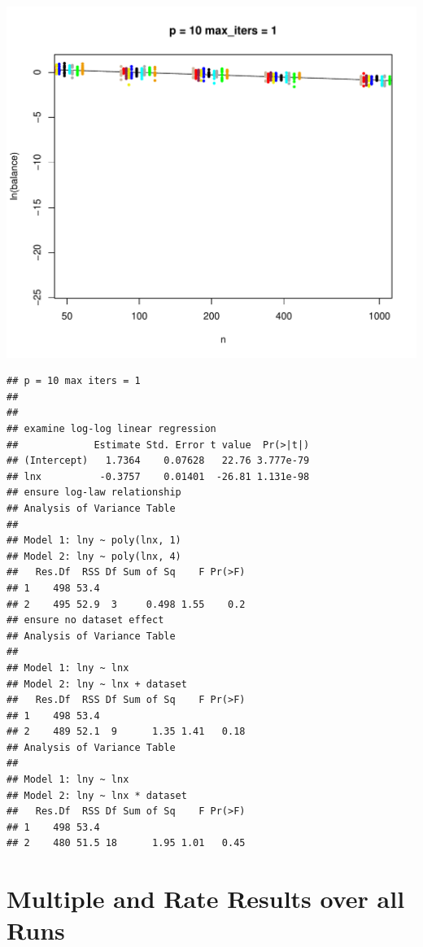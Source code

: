 \documentclass{article}\usepackage[]{graphicx}\usepackage[]{color}
\makeatletter
\def\maxwidth{ %
  \ifdim\Gin@nat@width>\linewidth
    \linewidth
  \else
    \Gin@nat@width
  \fi
}
\newenvironment{kframe}{%
 \def\at@end@of@kframe{}%
 \ifinner\ifhmode%
  \def\at@end@of@kframe{\end{minipage}}%
  \begin{minipage}{\columnwidth}%
 \fi\fi%
 \def\FrameCommand##1{\hskip\@totalleftmargin \hskip-\fboxsep
 \colorbox{shadecolor}{##1}\hskip-\fboxsep
     \hskip-\linewidth \hskip-\@totalleftmargin \hskip\columnwidth}%
 \MakeFramed {\advance\hsize-\width
   \@totalleftmargin\z@ \linewidth\hsize
   \@setminipage}}%
 {\par\unskip\endMakeFramed%
 \at@end@of@kframe}
\newenvironment{knitrout}{}{} %
\makeatother
\begin{document}
\begin{knitrout}
\includegraphics[width=\maxwidth]{figure/load_and_cleanup_data12} 
\begin{kframe}\begin{verbatim}
## p = 10 max iters = 1 
## 
## 
## examine log-log linear regression
##             Estimate Std. Error t value  Pr(>|t|)
## (Intercept)   1.7364    0.07628   22.76 3.777e-79
## lnx          -0.3757    0.01401  -26.81 1.131e-98
## ensure log-law relationship
## Analysis of Variance Table
## 
## Model 1: lny ~ poly(lnx, 1)
## Model 2: lny ~ poly(lnx, 4)
##   Res.Df  RSS Df Sum of Sq    F Pr(>F)
## 1    498 53.4                         
## 2    495 52.9  3     0.498 1.55    0.2
## ensure no dataset effect
## Analysis of Variance Table
## 
## Model 1: lny ~ lnx
## Model 2: lny ~ lnx + dataset
##   Res.Df  RSS Df Sum of Sq    F Pr(>F)
## 1    498 53.4                         
## 2    489 52.1  9      1.35 1.41   0.18
## Analysis of Variance Table
## 
## Model 1: lny ~ lnx
## Model 2: lny ~ lnx * dataset
##   Res.Df  RSS Df Sum of Sq    F Pr(>F)
## 1    498 53.4                         
## 2    480 51.5 18      1.95 1.01   0.45
\end{verbatim}
\end{kframe}
\end{knitrout}

\section{Multiple and Rate Results over all Runs}
\end{document}
